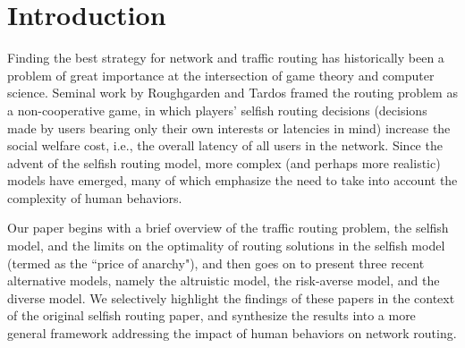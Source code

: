 \section{Introduction}
Finding the best strategy for network and traffic routing has historically been a problem of great importance at the intersection of game theory and computer science. 
Seminal work by Roughgarden and Tardos framed the routing problem as a non-cooperative game,
in which players' selfish routing decisions (decisions made by users bearing only their own interests or latencies in mind) increase the social welfare cost, i.e., the overall latency of all users in the network. Since the advent of the selfish routing model, more complex (and perhaps more realistic) models have emerged, many of which emphasize the need to take into account the complexity of human behaviors. 

Our paper begins with a brief overview of the traffic routing problem, the selfish model, and the limits on the optimality of routing solutions in the selfish model (termed as the ``price of anarchy"), and then goes on to present three recent alternative models, namely the altruistic model, the risk-averse model, and the diverse model. We selectively highlight the findings of these papers in the context of the original selfish routing paper, and synthesize the results into a more general framework addressing the impact of human behaviors on network routing.

